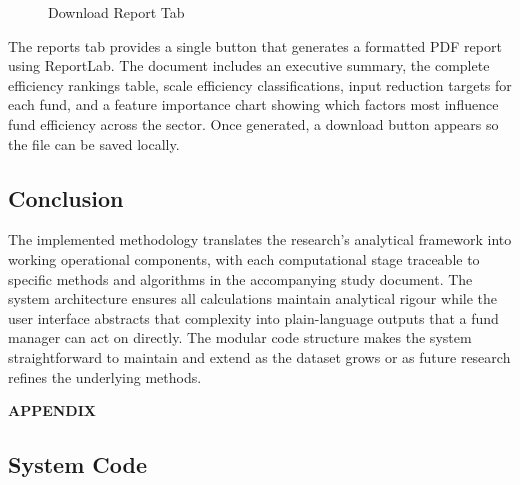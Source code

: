 \documentclass[12pt,a4paper]{report}
\begin{document}
\begin{figure}[H]
\centering
{}
\caption{Download Report Tab}
\label{fig:report_tab}
\end{figure}

The reports tab provides a single button that generates a formatted PDF report using
ReportLab. The document includes an executive summary, the complete efficiency rankings
table, scale efficiency classifications, input reduction targets for each fund, and a
feature importance chart showing which factors most influence fund efficiency across the
sector. Once generated, a download button appears so the file can be saved locally.

\subsection*{Conclusion}

The implemented methodology translates the research's analytical framework into working
operational components, with each computational stage traceable to specific methods and
algorithms in the accompanying study document. The system architecture ensures all
calculations maintain analytical rigour while the user interface abstracts that complexity
into plain-language outputs that a fund manager can act on directly. The modular code
structure makes the system straightforward to maintain and extend as the dataset grows or
as future research refines the underlying methods.

\newpage
\noindent\textbf{\large APPENDIX}
\vspace{0.5cm}

\subsection{System Code}
\end{document}
